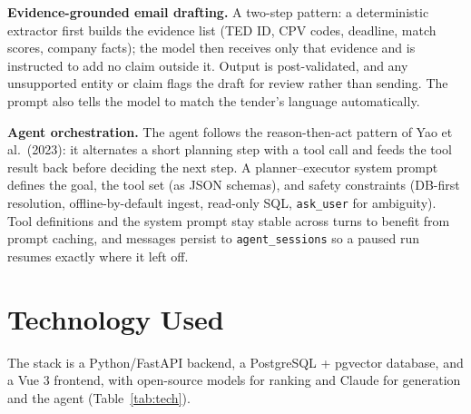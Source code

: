 \textbf{Evidence-grounded email drafting.} A two-step pattern: a deterministic
extractor first builds the evidence list (TED ID, CPV codes, deadline, match scores,
company facts); the model then receives only that evidence and is instructed to add no
claim outside it. Output is post-validated, and any unsupported entity or claim flags
the draft for review rather than sending. The prompt also tells the model to match the
tender's language automatically.

\textbf{Agent orchestration.} The agent follows the reason-then-act pattern of Yao
et al.\ (2023): it alternates a short planning step with a tool call and feeds the
tool result back before deciding the next step. A planner--executor system prompt
defines the goal, the tool set (as JSON schemas), and safety constraints (DB-first resolution,
offline-by-default ingest, read-only SQL, \texttt{ask\_user} for ambiguity). Tool
definitions and the system prompt stay stable across turns to benefit from prompt
caching, and messages persist to \texttt{agent\_sessions} so a paused run resumes
exactly where it left off.

\section{Technology Used}

The stack is a Python/FastAPI backend, a PostgreSQL + pgvector database, and a Vue 3
frontend, with open-source models for ranking and Claude for generation and the agent
(Table~\ref{tab:tech}).

